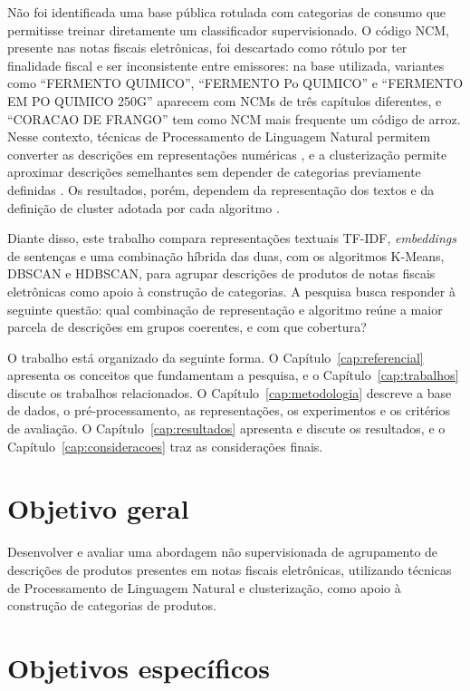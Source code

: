 \documentclass[english,brazilian]{UNISINOSmonografia}
\begin{document}
Não foi identificada uma base pública rotulada com categorias de consumo que permitisse treinar diretamente um classificador supervisionado. O código NCM, presente nas notas fiscais eletrônicas, foi descartado como rótulo por ter finalidade fiscal \cite{brasil2024ncm} e ser inconsistente entre emissores: na base utilizada, variantes como ``FERMENTO QUIMICO'', ``FERMENTO Po QUIMICO'' e ``FERMENTO EM PO QUIMICO 250G'' aparecem com NCMs de três capítulos diferentes, e ``CORACAO DE FRANGO'' tem como NCM mais frequente um código de arroz. Nesse contexto, técnicas de Processamento de Linguagem Natural permitem converter as descrições em representações numéricas \cite{manning2008informationretrieval}, e a clusterização permite aproximar descrições semelhantes sem depender de categorias previamente definidas \cite{tan2005introduction}. Os resultados, porém, dependem da representação dos textos e da definição de cluster adotada por cada algoritmo \cite{tan2005introduction}.

Diante disso, este trabalho compara representações textuais TF-IDF, \textit{embeddings} de sentenças e uma combinação híbrida das duas, com os algoritmos K-Means, DBSCAN e HDBSCAN, para agrupar descrições de produtos de notas fiscais eletrônicas como apoio à construção de categorias. A pesquisa busca responder à seguinte questão: qual combinação de representação e algoritmo reúne a maior parcela de descrições em grupos coerentes, e com que cobertura?

O trabalho está organizado da seguinte forma. O Capítulo~\ref{cap:referencial} apresenta os conceitos que fundamentam a pesquisa, e o Capítulo~\ref{cap:trabalhos} discute os trabalhos relacionados. O Capítulo~\ref{cap:metodologia} descreve a base de dados, o pré-processamento, as representações, os experimentos e os critérios de avaliação. O Capítulo~\ref{cap:resultados} apresenta e discute os resultados, e o Capítulo~\ref{cap:consideracoes} traz as considerações finais.

\section{Objetivo geral}

Desenvolver e avaliar uma abordagem não supervisionada de agrupamento de descrições de produtos presentes em notas fiscais eletrônicas, utilizando técnicas de Processamento de Linguagem Natural e clusterização, como apoio à construção de categorias de produtos.

\section{Objetivos específicos}
\end{document}
